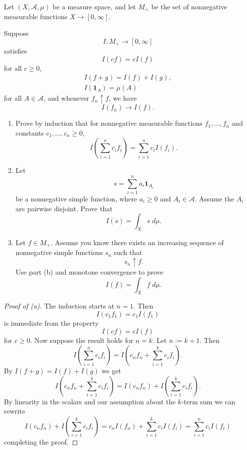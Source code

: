 \begin{prob}
    Let $(X,\mathcal A, \mu)$ be a measure space, and let 
    $M_+$ be the set of nonnegative measurable functions 
    $X \to [0,\infty]$. 

    Suppose 
    \[
        I : M_+ \to [0,\infty]
    \]
    satisfies 
    \[
        I(cf) = cI(f)
    \]
    for all $c \geq 0$, 
    \begin{align*}
        I(f+g) = I(f) + I(g), \\ 
        I(\textbf{1}_A) = \mu(A)
    \end{align*}
    for all $A \in \mathcal A$, and whenever 
    $f_n \uparrow f$, we have 
    \[
        I(f_n) \to I(f).
    \]

    \begin{enumerate}[label=\alph*)]
        \item Prove by induction that for nonnegative measurable 
            functions $f_1,\ldots,f_n$ and constants 
            $c_1,\ldots,c_n \geq 0$, 
            \[
                I\left(\sum_{i=1}^n c_if_i\right)
                = 
                \sum_{i=1}^n c_iI(f_i).
            \]
        \item Let 
            \[
                s = \sum_{i=1}^n a_i\textbf{1}_{A_i}
            \]
            be a nonnegative simple function, where 
            $a_i \geq 0$ and $A_i \in \mathcal A$. Assume the 
            $A_i$ are pairwise disjoint. Prove that 
            \[
                I(s) = \int_X s \; d\mu.
            \]
        \item Let $f \in M_+$. Assume you know there exists an 
            increasing sequence of nonnegative simple functions 
            $s_n$ such that 
            \[
                s_n \uparrow f. 
            \]
            Use part (b) and monotone convergence to prove 
            \[
                I(f) = \int_X f\; d\mu.
            \]
    \end{enumerate}
\end{prob}
\begin{proof}[Proof of (a)]
    The induction starts at $n = 1$. Then 
    \[
        I(c_1f_1) = c_1I(f_1)
    \]
    is immediate from the property 
    \[
        I(cf) = cI(f)
    \]
    for $c \geq 0$. 
    Now suppose the result holds for $n = k$. Let $n := k + 1$. 
    Then 
    \[
        I\left(\sum_{i=1}^n c_i f_i\right)
        = 
        I\left(c_nf_n + \sum_{i=1}^k c_i f_i\right). 
    \]
    By $I(f+g) = I(f) + I(g)$ we get 
    \[
        I\left(c_nf_n + \sum_{i=1}^k c_i f_i\right) 
        = 
        I(c_nf_n) + I\left(\sum_{i=1}^k c_if_i\right).
    \]
    By linearity in the scalars and our assumption about the 
    $k$-term sum we can rewrite 
    \[
        I(c_nf_n) + I\left(\sum_{i=1}^k c_if_i\right)
        = 
        c_nI(f_n) + \sum_{i=1}^k c_i I(f_i) 
        = \sum_{i=1}^n c_i I(f_i)
    \]
    completing the proof.
\end{proof}
